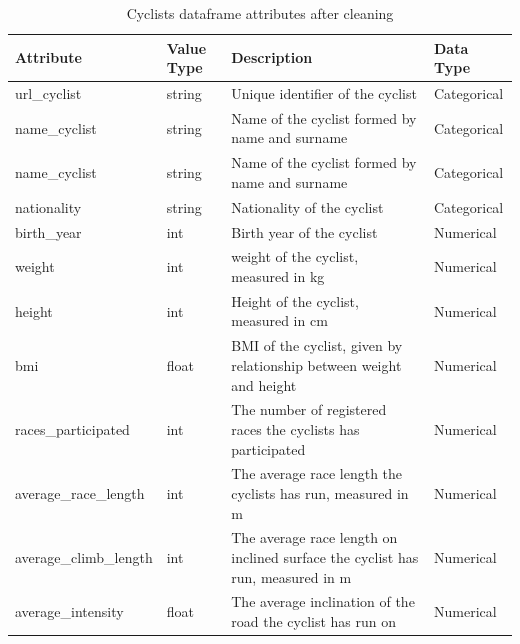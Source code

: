 \documentclass{article}
\begin{document}
\begin{table}[h!]
\centering
\begin{tabular}{|l|l|p{8cm}|l|}
\hline
\textbf{Attribute} & \textbf{Value Type} & \textbf{Description} & \textbf{Data Type} \\ \hline

url\_cyclist & string & Unique identifier of the cyclist & Categorical \\ \hline
name\_cyclist & string & Name of the cyclist formed by name and surname & Categorical \\ \hline
name\_cyclist & string & Name of the cyclist formed by name and surname & Categorical \\ \hline
nationality & string &Nationality of the cyclist & Categorical \\ \hline
birth\_year & int & Birth year of the cyclist & Numerical \\ \hline
weight & int & weight of the cyclist, measured in kg & Numerical \\ \hline
height & int & Height of the cyclist, measured in cm & Numerical \\ \hline
bmi & float & BMI of the cyclist, given by relationship between weight and height & Numerical \\ \hline
races\_participated & int & The number of registered races the cyclists has participated & Numerical \\ \hline
average\_race\_length & int & The average race length the cyclists has run, measured in m & Numerical \\ \hline
average\_climb\_length & int & The average race length on inclined surface the cyclist has run, measured in m & Numerical \\ \hline
average\_intensity & float & The average inclination of the road the cyclist has run on & Numerical \\ \hline

\end{tabular}
\caption{Cyclists dataframe attributes after cleaning}
\label{tab:example}
\end{table}
\end{document}
